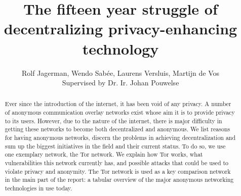 \documentclass{article}
\begin{document}


\title{The fifteen year struggle of decentralizing privacy-enhancing technology}
\author{Rolf Jagerman, Wendo Sab\'ee, Laurens Versluis, Martijn de Vos\\ Supervised by Dr. Ir. Johan Pouwelse}
\date{}

\pagestyle{empty}


\maketitle
\thispagestyle{empty}

\begin{abstract}
	Ever since the introduction of the internet, it has been void of any privacy. A number of anonymous communication overlay networks exist whose aim it is to provide privacy to its users. However, due to the nature of the internet, there is major difficulty in getting these networks to become both decentralized and anonymous. We list reasons for having anonymous networks, discern the problems in achieving decentralization and sum up the biggest initiatives in the field and their current status. To do so, we use one exemplary network, the Tor network. We explain how Tor works, what vulnerabilities this network currently has, and possible attacks that could be used to violate privacy and anonymity. The Tor network is used as a key comparison network in the main part of the report: a tabular overview of the major anonymous networking technologies in use today.
	
	

\end{abstract}
\end{document}
